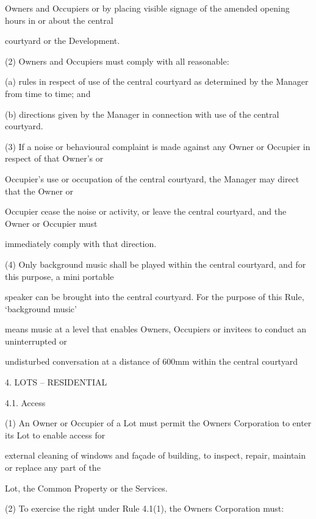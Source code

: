 \documentclass{article}
\begin{document}
{\fontsize{10.02}{1}Owners and Occupiers or by placing visible signage of the amended opening hours in or about the central }

{\fontsize{10.02}{1}courtyard or the Development.  }

\newpage

{\fontsize{9.962}{1}(2) Owners and Occupiers must comply with all reasonable: }

{\fontsize{9.962}{1}(a) rules in respect of use of the central courtyard as determined by the Manager from time to time; and }

{\fontsize{9.962}{1}(b) directions given by the Manager in connection with use of the central courtyard. }

{\fontsize{9.962}{1}(3) If a noise or behavioural complaint is made against any Owner or Occupier in respect of that Owner’s or }

{\fontsize{10.02}{1}Occupier’s use or occupation of the central courtyard, the Manager may direct that the Owner or }

{\fontsize{10.02}{1}Occupier cease the noise or activity, or leave the central courtyard, and the Owner or Occupier must }

{\fontsize{10.02}{1}immediately comply with that direction. }

{\fontsize{9.962}{1}(4) Only background music shall be played within the central courtyard, and for this purpose, a mini portable }

{\fontsize{10.02}{1}speaker can be brought into the central courtyard. For the purpose of this Rule, ‘background music’ }

{\fontsize{10.02}{1}means music at a level that enables Owners, Occupiers or invitees to conduct an uninterrupted or }

{\fontsize{10.02}{1}undisturbed conversation at a distance of 600mm within the central courtyard  }

{\fontsize{9.99}{1}4. LOTS – RESIDENTIAL }

{\fontsize{9.99}{1}4.1. Access }

{\fontsize{9.962}{1}(1) An Owner or Occupier of a Lot must permit the Owners Corporation to enter its Lot to enable access for }

{\fontsize{10.02}{1}external cleaning of windows and façade of building, to inspect, repair, maintain or replace any part of the }

{\fontsize{10.02}{1}Lot, the Common Property or the Services. }

{\fontsize{9.962}{1}(2) To exercise the right under Rule 4.1(1), the Owners Corporation must: }
\end{document}
